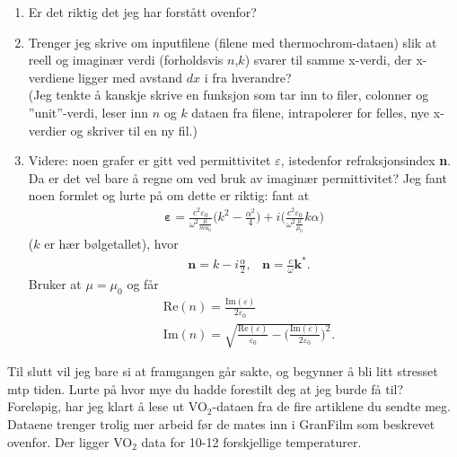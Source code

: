 \begin{enumerate}
   \item Er det riktig det jeg har forstått ovenfor? 
   \item Trenger jeg skrive om inputfilene (filene med thermochrom-dataen) 
      slik at reell og imaginær verdi (forholdsvis $n$,$k$)
      svarer til samme x-verdi, der x-verdiene ligger med avstand $d\!x$ i fra hverandre?\\
      (Jeg tenkte å kanskje skrive en funksjon som tar inn to filer, colonner og ''unit''-verdi, 
      leser inn $n$ og $k$ dataen fra filene, intrapolerer for felles, nye x-verdier og skriver til 
      en ny fil.)
   \item Videre: noen grafer er gitt ved permittivitet $\varepsilon$, istedenfor refraksjonsindex \textbf{n}.
      Da er det vel bare å regne om ved bruk av imaginær permittivitet? Jeg fant noen formlet og lurte på 
      om dette er riktig: fant at 
      \begin{align*}
         \boldsymbol{\varepsilon} =
            \frac{c^2 \varepsilon_0}{\omega^2 \frac{\mu}{mu_0}} \Bigg( k^2 - \frac{\alpha ^2}{4}\Bigg)  
            + i\Bigg( \frac{c^2 \varepsilon_0}{\omega^2 \frac{\mu}{\mu_0}} k \alpha \Bigg)
      \end{align*}
      ($k$ er hær bølgetallet), hvor 
      \begin{align*}
         &\boldsymbol{n} = k - i\frac{\alpha}{2}, & \boldsymbol{n} = \frac{c}{\omega} \boldsymbol{k}^*.
      \end{align*}
      Bruker at $\mu = \mu_0$ og får
      \begin{align*}
         &\text{Re}(n) = \frac{\text{Im}(\varepsilon)}{2 \varepsilon_0} \\
         &\text{Im}(n) = \sqrt{\frac{\text{Re}(\varepsilon)}{\varepsilon_0} - 
         \Bigg( \frac{\text{Im}(\varepsilon)}{2 \varepsilon_0} \Bigg) ^2}.
      \end{align*}
\end{enumerate}

Til slutt vil jeg bare si at framgangen går sakte, og begynner å bli litt stresset mtp tiden. Lurte
på hvor mye du hadde forestilt deg at jeg burde få til? Foreløpig, har jeg klart å lese ut 
VO$_2$-dataen fra de fire artiklene du sendte meg. Dataene trenger trolig mer arbeid før de mates inn
i GranFilm som beskrevet ovenfor. Der ligger VO$_2$ data for 10-12 forskjellige temperaturer.



